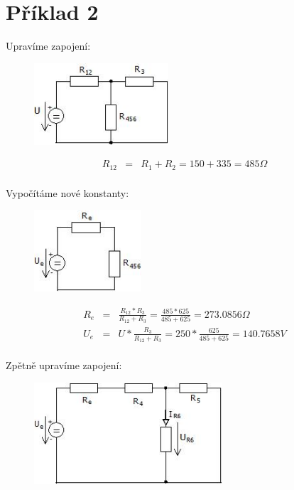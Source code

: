 \section{Příklad 2}

Upravíme zapojení:
    \begin{figure}[ht]
		\begin{center}
			\includegraphics[width=5cm,keepaspectratio]{fig/Pr2_1_2019.jpeg}
		\end{center}
	\end{figure}
	
    \begin{eqnarray*}
        R_{12} &= & R_{1} + R_{2} = 150 + 335 = 485 \Omega\\
	\end{eqnarray*}

Vypočítáme nové konstanty:
    \begin{figure}[ht]
		\begin{center}
			\includegraphics[width=4cm,keepaspectratio]{fig/Pr2_2_2019.jpeg}
		\end{center}
	\end{figure}
	
    \begin{eqnarray*}
        R_{e} &= & \frac{R_{12} * R_{3}}{R_{12} + R_{3}} = \frac{485 * 625}{485 + 625} = 273.0856 \Omega\\
        U_{e} &= & U * \frac{R_{3}}{R_{12} + R_{3}} = 250 * \frac{625}{485 + 625} = 140.7658 V\\
	\end{eqnarray*}
	
\pagebreak
Zpětně upravíme zapojení:
    \begin{figure}[ht]
		\begin{center}
			\includegraphics[width=7cm,keepaspectratio]{fig/Pr2_3_2019.jpeg}
		\end{center}
	\end{figure}

